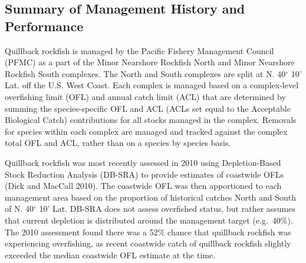 \documentclass[11pt,
  english,
  letterpaper,
]{article}
\begin{document}
\leavevmode\tagmcend\tagstructend\par


\hypertarget{summary-of-management-history-and-performance}{%
\subsection{Summary of Management History and Performance}\label{summary-of-management-history-and-performance}}

\leavevmode\tagmcend\tagstructend


Quillback rockfish is managed by the Pacific Fishery Management Council (PFMC) as a part of the Minor Nearshore Rockfish North and Minor Nearshore Rockfish South complexes. The North and South complexes are split at N. 40{\(^\circ\)\leavevmode\tagmcend\tagstructend} 10' Lat. off the U.S. West Coast. Each complex is managed based on a complex-level overfishing limit (OFL) and annual catch limit (ACL) that are determined by summing the species-specific OFL and ACL (ACLs set equal to the Acceptable Biological Catch) contributions for all stocks managed in the complex. Removals for species within each complex are managed and tracked against the complex total OFL and ACL, rather than on a species by species basis.

\leavevmode\tagmcend\tagstructend\par


Quillback rockfish was most recently assessed in 2010 using Depletion-Based Stock Reduction Analysis (DB-SRA) to provide estimates of coastwide OFLs {(Dick and MacCall 2010)\leavevmode\tagmcend\tagstructend}. The coastwide OFL was then apportioned to each management area based on the proportion of historical catches North and South of N. 40{\(^\circ\)\leavevmode\tagmcend\tagstructend} 10' Lat. DB-SRA does not assess overfished status, but rather assumes that current depletion is distributed around the management target (e.g.~40\%). The 2010 assessment found there was a 52\% chance that quillback rockfish was experiencing overfishing, as recent coastwide catch of quillback rockfish slightly exceeded the median coastwide OFL estimate at the time.
\end{document}
